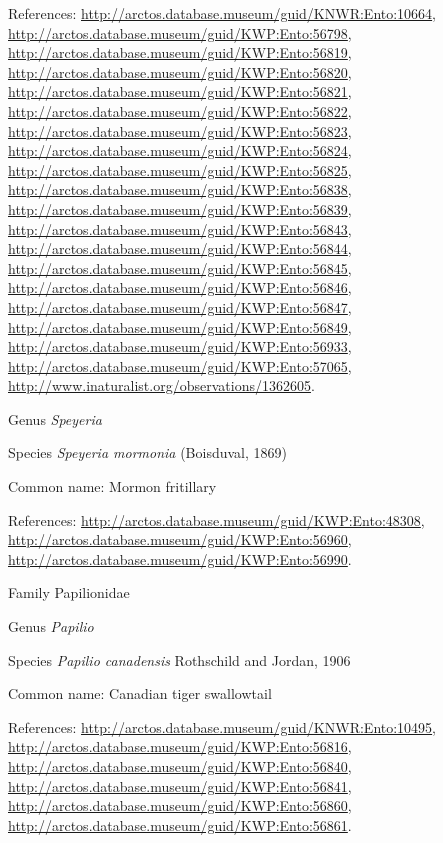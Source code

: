 \documentclass[9pt, article]{memoir}
\begin{document}
\begin{multicols}{2}
References: 
\url{http://arctos.database.museum/guid/KNWR:Ento:10664}, 
\url{http://arctos.database.museum/guid/KWP:Ento:56798}, 
\url{http://arctos.database.museum/guid/KWP:Ento:56819}, 
\url{http://arctos.database.museum/guid/KWP:Ento:56820}, 
\url{http://arctos.database.museum/guid/KWP:Ento:56821}, 
\url{http://arctos.database.museum/guid/KWP:Ento:56822}, 
\url{http://arctos.database.museum/guid/KWP:Ento:56823}, 
\url{http://arctos.database.museum/guid/KWP:Ento:56824}, 
\url{http://arctos.database.museum/guid/KWP:Ento:56825}, 
\url{http://arctos.database.museum/guid/KWP:Ento:56838}, 
\url{http://arctos.database.museum/guid/KWP:Ento:56839}, 
\url{http://arctos.database.museum/guid/KWP:Ento:56843}, 
\url{http://arctos.database.museum/guid/KWP:Ento:56844}, 
\url{http://arctos.database.museum/guid/KWP:Ento:56845}, 
\url{http://arctos.database.museum/guid/KWP:Ento:56846}, 
\url{http://arctos.database.museum/guid/KWP:Ento:56847}, 
\url{http://arctos.database.museum/guid/KWP:Ento:56849}, 
\url{http://arctos.database.museum/guid/KWP:Ento:56933}, 
\url{http://arctos.database.museum/guid/KWP:Ento:57065}, 
\url{http://www.inaturalist.org/observations/1362605}.

\vspace{6pt}\noindent\hspace{30pt}Genus \textit{Speyeria}


\vspace{6pt}\noindent\hspace{36pt}Species \textit{Speyeria mormonia} (Boisduval, 1869)


Common name: Mormon fritillary

References: 
\url{http://arctos.database.museum/guid/KWP:Ento:48308}, 
\url{http://arctos.database.museum/guid/KWP:Ento:56960}, 
\url{http://arctos.database.museum/guid/KWP:Ento:56990}.

\vspace{6pt}\noindent\hspace{24pt}Family Papilionidae


\vspace{6pt}\noindent\hspace{30pt}Genus \textit{Papilio}


\vspace{6pt}\noindent\hspace{36pt}Species \textit{Papilio canadensis} Rothschild and Jordan, 1906


Common name: Canadian tiger swallowtail

References: 
\url{http://arctos.database.museum/guid/KNWR:Ento:10495}, 
\url{http://arctos.database.museum/guid/KWP:Ento:56816}, 
\url{http://arctos.database.museum/guid/KWP:Ento:56840}, 
\url{http://arctos.database.museum/guid/KWP:Ento:56841}, 
\url{http://arctos.database.museum/guid/KWP:Ento:56860}, 
\url{http://arctos.database.museum/guid/KWP:Ento:56861}.


\end{multicols}
\end{document}
